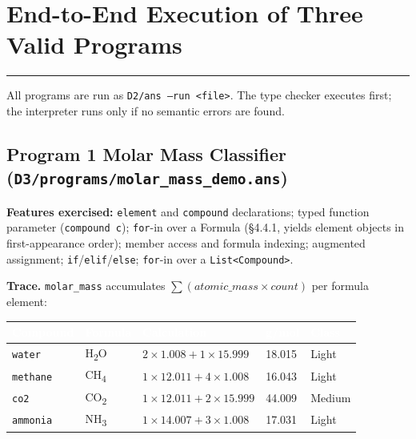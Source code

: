 \documentclass[11pt,a4paper]{article}
\newcommand{\code}[1]{\texttt{#1}}
\newcommand{\file}[1]{{\footnotesize\texttt{#1}}}
\newcommand{\sectionrule}{\vspace{-3pt}\textcolor{ansborder}{\rule{\textwidth}{0.6pt}}\vspace{2pt}}
\begin{document}
\section{End-to-End Execution of Three Valid Programs}
\sectionrule

All programs are run as \code{D2/ans --run <file>}. The type checker executes
first; the interpreter runs only if no semantic errors are found.

\subsection{Program 1 \textemdash{} Molar Mass Classifier
  (\file{D3/programs/molar\_mass\_demo.ans})}

\textbf{Features exercised:} \code{element} and \code{compound} declarations;
typed function parameter (\code{compound c}); \code{for}-in over a Formula
(§4.4.1, yields element objects in first-appearance order); member access and
formula indexing; augmented assignment; \code{if}/\code{elif}/\code{else};
\code{for}-in over a \code{List<Compound>}.

\smallskip
\textbf{Trace.} \code{molar\_mass} accumulates
$\textstyle\sum(\textit{atomic\_mass}\times\textit{count})$ per formula element:

\begin{table}[h]
\vspace{2pt}
\centering\small
{}
\begin{tabularx}{\textwidth}{@{} L{2.0cm} L{1.8cm} L{5.2cm} L{1.6cm} L{1.8cm} @{}}
\toprule
{}
\textcolor{white}{\textbf{Compound}} &
\textcolor{white}{\textbf{Formula}} &
\textcolor{white}{\textbf{Calculation}} &
\textcolor{white}{\textbf{g/mol}} &
\textcolor{white}{\textbf{Class}} \\
\midrule
\code{water}   & H\textsubscript{2}O  & $2{\times}1.008 + 1{\times}15.999$ & 18.015 & Light \\
\code{methane} & CH\textsubscript{4}  & $1{\times}12.011 + 4{\times}1.008$ & 16.043 & Light \\
\code{co2}     & CO\textsubscript{2}  & $1{\times}12.011 + 2{\times}15.999$ & 44.009 & Medium \\
\code{ammonia} & NH\textsubscript{3}  & $1{\times}14.007 + 3{\times}1.008$ & 17.031 & Light \\
\bottomrule
\end{tabularx}
\end{table}
\end{document}
